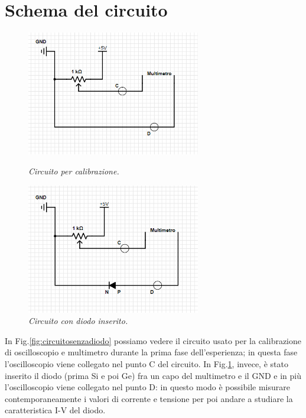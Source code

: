 \documentclass[a4paper, 11pt]{article}
\begin{document}
\section{Schema del circuito}
\begin{figure}[!ht]
  \centering
  \begin{minipage}[b]{0.51\textwidth}
    \includegraphics[width=76mm]{Immagini - Prima prova/LAB _ Circuito senza diodo.png}
    \caption{\textit{Circuito per calibrazione.}}
    \label{fig:circuitosenzadiodo}
  \end{minipage}
  \hfill
  \begin{minipage}[b]{0.48\textwidth}
    \includegraphics[width=76mm]{Immagini - Prima prova/LAB _ Circuito con diodo.png}
    \caption{\textit{Circuito con diodo inserito.}}
    \label{fig:circuitocondiodo}
  \end{minipage}
\end{figure}
In Fig.\ref{fig:circuitosenzadiodo} possiamo vedere il circuito usato per la calibrazione di oscilloscopio e multimetro durante la prima fase dell'esperienza; in questa fase l'oscilloscopio viene collegato nel punto C del circuito. In Fig.\ref{fig:circuitocondiodo}, invece, è stato inserito il diodo (prima Si e poi Ge) fra un capo del multimetro e il GND e in più l'oscilloscopio viene collegato nel punto D: in questo modo è possibile misurare contemporaneamente i valori di corrente e tensione per poi andare a studiare la caratteristica I-V del diodo.
\end{document}
